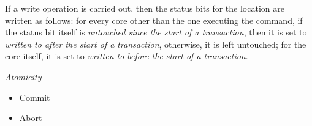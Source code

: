 If a write operation is carried out, then the status bits for the location are
written as follows: for every core other than the one executing the command, if
the status bit itself is \textit{untouched since the start of a transaction},
then it is set to \textit{written to after the start of a transaction},
otherwise, it is left untouched; for the core itself, it is set to
\textit{written to before the start of a transaction}.

\textit{Atomicity}
  \begin{itemize}
    \item Commit
    \item Abort
  \end{itemize}
